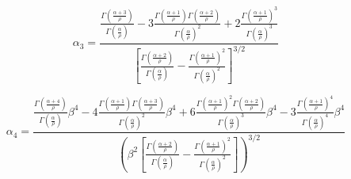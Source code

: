 \begin{frame}
    \begin{equation*}
        \alpha_3 = \frac{
                        \frac{ \Gamma \left (\frac{\alpha+3}{\rho}\right) }{ \Gamma \left (\frac{\alpha}{\rho} \right) }
                        - 3 \frac{ \Gamma \left (\frac{\alpha+1}{\rho} \right) \Gamma \left (\frac{\alpha+2}{\rho} \right) }{ \Gamma \left ( \frac{\alpha}{\rho} \right)^2 }
                        + 2 \frac{\Gamma \left (\frac{\alpha+1}{\rho} \right)^3}{\Gamma \left ( \frac{\alpha}{\rho} \right)^3}
                    }{
                        \left[ \frac{\Gamma \left (\frac{\alpha+2}{\rho} \right)}{{\Gamma \left ( \frac{\alpha}{\rho} \right)}} -
                        \frac{\Gamma \left (\frac{\alpha+1}{\rho} \right)^2}{{\Gamma \left ( \frac{\alpha}{\rho} \right)}^2} \right]^{3/2}
                    }
    \end{equation*}

    \vspace{1cm}

    \begin{equation*}
        \alpha_4 = \frac{
                        \frac{ \Gamma \left (\frac{\alpha+4}{\rho}\right) }{ \Gamma \left (\frac{\alpha}{\rho} \right) } \beta^4
                        - 4 \frac{ \Gamma \left (\frac{\alpha+1}{\rho}\right) \Gamma \left (\frac{\alpha+3}{\rho} \right)}{ \Gamma \left (\frac{\alpha}{\rho} \right)^2 } \beta^4
                        + 6 \frac{ \Gamma \left (\frac{\alpha+1}{\rho} \right)^2 \Gamma \left (\frac{\alpha+2}{\rho} \right) }{ \Gamma \left ( \frac{\alpha}{\rho} \right)^3 } \beta^4
                        - 3 \frac{\Gamma \left (\frac{\alpha+1}{\rho} \right)^4}{\Gamma \left ( \frac{\alpha}{\rho} \right)^4} \beta^4
                    }{
                        \left( \beta^2 \left[ \frac{\Gamma \left (\frac{\alpha+2}{\rho} \right)}{{\Gamma \left ( \frac{\alpha}{\rho} \right)}} -
                        \frac{\Gamma \left (\frac{\alpha+1}{\rho} \right)^2}{{\Gamma \left ( \frac{\alpha}{\rho} \right)}^2} \right] \right)^{3/2}
                    }
    \end{equation*}
\end{frame}

